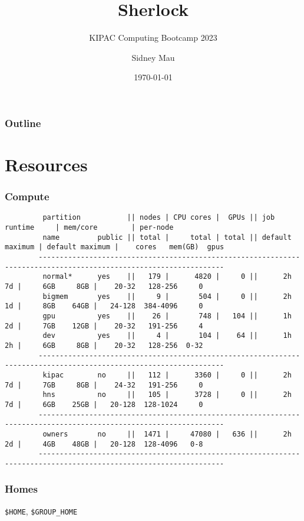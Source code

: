 \documentclass[aspectratio=169]{beamer}
\title{Sherlock}
\subtitle{KIPAC Computing Bootcamp 2023}
\author[S. Mau]{Sidney Mau}
\institute[Stanford]{Stanford University}
\date[\today]{\today}
\begin{document}

\frame{\titlepage}

\begin{frame}
	\frametitle{Outline}
	\tableofcontents
\end{frame}


\section{Resources}

\frame{\sectionpage}

\begin{frame}[t,fragile]
	\frametitle{Compute}
	\begin{verbatim}
		 partition           || nodes | CPU cores |  GPUs || job runtime     | mem/core        | per-node
		 name         public || total |     total | total || default maximum | default maximum |    cores   mem(GB)  gpus
		------------------------------------------------------------------------------------------------------------------
		 normal*      yes    ||   179 |      4820 |     0 ||      2h      7d |     6GB     8GB |    20-32   128-256     0
		 bigmem       yes    ||     9 |       504 |     0 ||      2h      1d |     8GB    64GB |   24-128  384-4096     0
		 gpu          yes    ||    26 |       748 |   104 ||      1h      2d |     7GB    12GB |    20-32   191-256     4
		 dev          yes    ||     4 |       104 |    64 ||      1h      2h |     6GB     8GB |    20-32   128-256  0-32
		------------------------------------------------------------------------------------------------------------------
		 kipac        no     ||   112 |      3360 |     0 ||      2h      7d |     7GB     8GB |    24-32   191-256     0
		 hns          no     ||   105 |      3728 |     0 ||      2h      7d |     6GB    25GB |   20-128  128-1024     0
		------------------------------------------------------------------------------------------------------------------
		 owners       no     ||  1471 |     47080 |   636 ||      2h      2d |     4GB    48GB |   20-128  128-4096   0-8
		------------------------------------------------------------------------------------------------------------------
	\end{verbatim}
\end{frame}

\begin{frame}[t]
	\frametitle{Homes}
		\texttt{\$HOME}, \texttt{\$GROUP\_HOME}
\end{frame}
\end{document}
